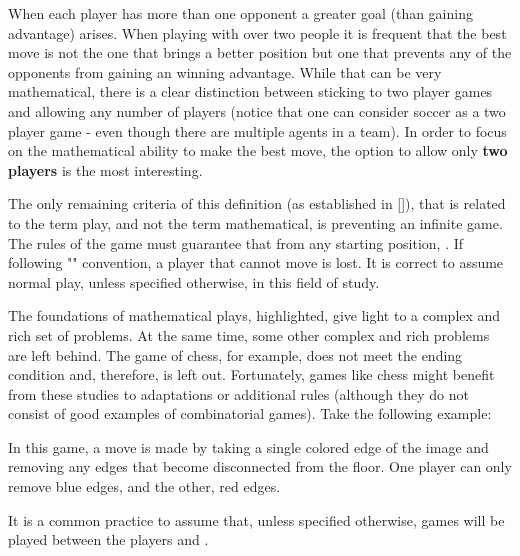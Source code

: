 When each player has more than one opponent a greater goal (than gaining advantage) arises. When playing with over two people it is frequent that the best move is not the one that brings  a better position but one that prevents any of the opponents from gaining an winning advantage. While that can be very mathematical, there is a clear distinction between sticking to two player games and allowing any number of players (notice that one can consider soccer as a two player game - even though there are multiple agents in a team). In order to focus on the mathematical ability to make the best move, the option to allow only \textbf{two players} is the most interesting.

The only remaining criteria of this definition (as established in []), that is related to the term play, and not the term mathematical, is preventing an infinite game. The rules of the game must guarantee that from any starting position, . If following "" convention, a player that cannot move is lost. It is  correct to assume normal play, unless specified otherwise, in this field of study.

The foundations of mathematical plays, highlighted, give light to a complex and rich set of problems. At the same time, some other complex and rich problems are left behind. The game of chess, for example, does not meet the ending condition and, therefore, is left out. Fortunately, games like chess might benefit from these studies to adaptations or additional rules (although they do not consist of good examples of combinatorial games). Take the following example:\\



In this game, a move is made by taking a single colored edge of the image and removing any edges that become disconnected from the floor. One player can only remove blue edges, and the other, red edges.

It is a common practice to assume that, unless specified otherwise, games will be played between the players  and .



